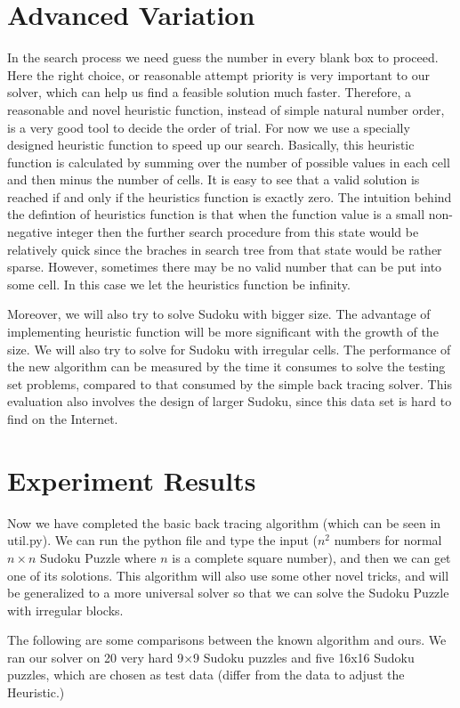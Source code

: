 \documentclass[12pt]{article}
\begin{document}
\begin{spacing}{1.1}
\section{Advanced Variation}
In the search process we need guess the number in every blank box to proceed. Here the right choice, or reasonable attempt priority is very important to our solver, which can help us find a feasible solution much faster. Therefore, a reasonable and novel heuristic function, instead of simple natural number order, is a very good tool to decide the order of trial. For now we use a specially designed heuristic function to speed up our search. Basically, this heuristic function is calculated by summing over the number of possible values in each cell and then minus the number of cells. It is easy to see that a valid solution is reached if and only if the heuristics function is exactly zero.  The intuition behind the defintion of heuristics function is that when the function value is a small non-negative integer then the further search procedure from this state would be relatively quick since the braches in search tree from that state would be rather sparse. However, sometimes there may be no valid number that can be put into some cell. In this case we let the heuristics function be infinity.

Moreover, we will also try to solve Sudoku with bigger size. The advantage of implementing heuristic function will be more significant with the growth of the size. We will also try to solve for Sudoku with irregular cells. The performance of the new algorithm can be measured by the time it consumes to solve the testing set problems, compared to that consumed by the simple back tracing solver. This evaluation also involves the design of larger Sudoku, since this data set is hard to find on the Internet.

\section{Experiment Results}
Now we have completed the basic back tracing algorithm (which can be seen in util.py). We can run the python file and type the input ($n^2$ numbers for normal $n\times n$ Sudoku Puzzle where $n$ is a complete square number), and then we can get one of its solotions. This algorithm will also use some other novel tricks, and will be generalized to a more universal solver so that we can solve the Sudoku Puzzle with irregular blocks.

The following are some comparisons between the known algorithm and ours. We ran our solver on 20 very hard  9×9 Sudoku puzzles and five 16x16 Sudoku puzzles, which are chosen as test data (differ from the data to adjust the Heuristic.)


\end{spacing}
\end{document}
